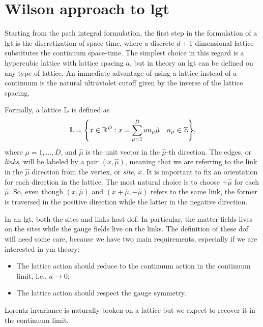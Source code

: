 \section{Wilson approach to \acl{lgt}}
\label{sec:wilson_approach_to_lft}

Starting from the path integral formulation, the first step in the formulation of a \ac{lgt} is the discretization of space-time, where a discrete $d+1$-dimensional lattice substitutes the continuum space-time.
The simplest choice in this regard is a hypercubic lattice with lattice spacing $a$, but in theory an \ac{lgt} can be defined on any type of lattice.
An immediate advantage of using a lattice instead of a continuum is the natural ultraviolet cutoff given by the inverse of the lattice spacing.

Formally, a lattice $\mathbb{L}$ is defined as
\begin{equation}
    \mathbb{L} = \qty{
        x \in \mathbb{R}^{D} :
        x = \sum_{\mu = 1}^{D} a n_{\mu} \hat{\mu} \quad
        n_{\mu} \in \mathbb{Z}},
\end{equation}
where $\mu = 1, \dots, D$, and $\hat{\mu}$ is the unit vector in the $\hat{\mu}$-th direction.
The edges, or \emph{links}, will be labeled by a pair $(x,\hat{\mu})$, meaning that we are referring to the link in the $\hat{\mu}$ direction from the vertex, or \emph{site}, $x$.
It is important to fix an orientation for each direction in the lattice.
The most natural choice is to choose $+ \hat{\mu}$ for each $\hat{\mu}$.
So, even though $(x,\hat{\mu})$ and $(x + \hat{\mu}, - \hat{\mu})$ refers to the same link, the former is traversed in the positive direction while the latter in the negative direction.

In an \ac{lgt}, both the sites and links host \ac{dof}.
In particular, the matter fields lives on the sites while the gauge fields live on the links.
The definition of these \ac{dof} will need some care, because we have two main requirements, especially if we are interested in \ac{ym} theory:
\begin{itemize}
    \item The lattice action should reduce to the continuum action in the continuum limit, i.e., $a \to 0$;
    \item The lattice action should respect the gauge symmetry.
\end{itemize}
Lorentz invariance is naturally broken on a lattice but we expect to recover it in the continuum limit.

